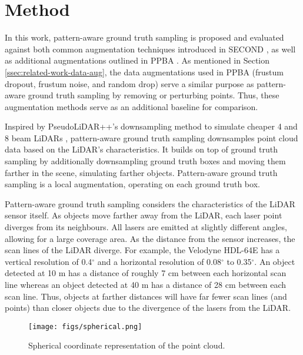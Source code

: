 \documentclass[10pt, conference, compsocconf]{IEEEtran}
\begin{document}
\section{Method}

In this work, pattern-aware ground truth sampling is proposed and evaluated against both common augmentation techniques introduced in SECOND \cite{Yan2018}, as well as additional augmentations outlined in PPBA \cite{Cheng2020}. As mentioned in Section \ref{ssec:related-work-data-aug}, the data augmentations used in PPBA (frustum dropout, frustum noise, and random drop) serve a similar purpose as pattern-aware ground truth sampling by removing or perturbing points. Thus, these augmentation methods serve as an additional baseline for comparison.

Inspired by PseudoLiDAR++'s downsampling method to simulate cheaper 4 and 8 beam LiDARs \cite{You2019}, pattern-aware ground truth sampling downsamples point cloud data based on the LiDAR's characteristics. It builds on top of ground truth sampling \cite{Yan2018} by additionally downsampling ground truth boxes and moving them farther in the scene, simulating farther objects. Pattern-aware ground truth sampling is a local augmentation, operating on each ground truth box.

Pattern-aware ground truth sampling considers the characteristics of the LiDAR sensor itself. As objects move farther away from the LiDAR, each laser point diverges from its neighbours. All lasers are emitted at slightly different angles, allowing for a large coverage area. As the distance from the sensor increases, the scan lines of the LiDAR diverge. For example, the Velodyne HDL-64E has a vertical resolution of 0.4$^\circ$ and a horizontal resolution of 0.08$^\circ$ to 0.35$^\circ$. An object detected at 10 m has a distance of roughly 7 cm between each horizontal scan line whereas an object detected at 40 m has a distance of 28 cm between each scan line. Thus, objects at farther distances will have far fewer scan lines (and points) than closer objects due to the divergence of the lasers from the LiDAR.

\begin{figure}[ht!]
\centering
\texttt{[image: figs/spherical.png]}
\caption{Spherical coordinate representation of the point cloud.}
\label{fig:spherical}
\end{figure}
\end{document}
